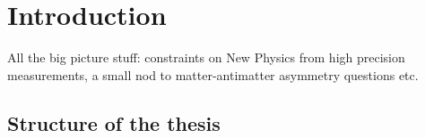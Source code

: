 
\chapter{\label{ch:1-intro}Introduction
} 



All the big picture stuff: constraints on New Physics from high precision measurements, a small nod to matter-antimatter asymmetry questions etc. 

\section{Structure of the thesis} %
\label{sec:structure_of_the_thesis}

